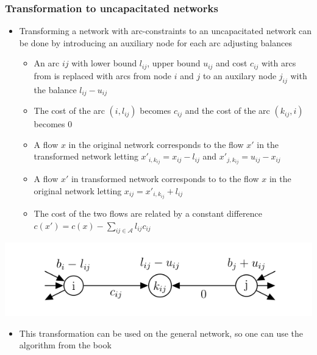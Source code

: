 \documentclass[11pt]{article}
\begin{document}
\subsubsection{Transformation to uncapacitated networks}
\label{sec:org5e6d3f6}
\begin{itemize}
\item Transforming a network with arc-constraints to an uncapacitated network can be done by introducing an auxiliary node for each arc adjusting balances
\begin{itemize}
\item An arc \(ij\) with lower bound \(l_{ij}\), upper bound \(u_{ij}\) and cost \(c_{ij}\) with arcs from is replaced with arcs from node \(i\) and \(j\) to an auxilary node \(j_{ij}\) with the balance \(l_{ij} - u_{ij}\)
\item The cost of the arc \((i,l_{ij})\) becomes \(c_{ij}\) and the cost of the arc \((k_{ij}, i)\) becomes \(0\)
\item A flow \(x\) in the original network corresponds to the flow \(x'\) in the transformed network letting \(x'_{i,k_{ij}} = x_{ij} - l_{ij}\) and \(x'_{j,k_{ij}} = u_{ij} - x_{ij}\)
\item A flow \(x'\) in transformed network corresponds to to the flow \(x\) in the original network letting \(x_{ij} = x'_{i,k_{ij}} + l_{ij}\)
\item The cost of the two flows are related by a constant difference \(c(x') = c(x) - \sum_{ij \in \mathcal A} l_{ij} c_{ij}\)
\end{itemize}
\end{itemize}

\begin{center}
\includegraphics[width=.9\linewidth]{Network Flows/screenshot_2019-03-03_14-40-47.png}
\end{center}

\begin{itemize}
\item This transformation can be used on the general network, so one can use the algorithm from the book
\end{itemize}
\end{document}
